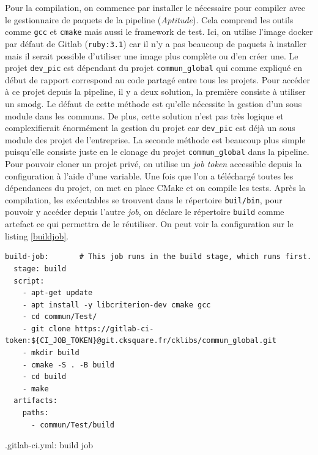 \documentclass[a4paper]{article}
\begin{document}
Pour la compilation, on commence par installer le nécessaire pour compiler avec
le gestionnaire de paquets de la pipeline (\textit{Aptitude}). Cela comprend les
outils comme \verb|gcc| et \verb|cmake| mais aussi le framework de test. Ici, on
utilise l'image docker par défaut de Gitlab (\verb|ruby:3.1|) car il n'y a pas
beaucoup de paquets à installer mais il serait possible d'utiliser une image
plus complète ou d'en créer une. Le projet \verb|dev_pic| est dépendant du
projet \verb|commun_global| qui comme expliqué en début de rapport correspond au
code partagé entre tous les projets. Pour accéder à ce projet depuis la
pipeline, il y a deux solution, la première consiste à utiliser un \gls{smodg}.
Le défaut de cette méthode est qu'elle nécessite la gestion d'un sous module
dans les communs. De plus, cette solution n'est pas très logique et
complexifierait énormément la gestion du projet car \verb|dev_pic| est déjà un
sous module des projet de l'entreprise. La seconde méthode est beaucoup plus
simple puisqu'elle consiste juste en le clonage du projet \verb|commun_global|
dans la pipeline. Pour pouvoir cloner un projet privé, on utilise un \textit{job
token} accessible depuis la configuration à l'aide d'une variable. Une fois que
l'on a téléchargé toutes les dépendances du projet, on met en place CMake et on
compile les tests. Après la compilation, les exécutables se trouvent dans le
répertoire \verb|buil/bin|, pour pouvoir y accéder depuis l'autre \textit{job},
on déclare le répertoire \verb|build| comme artefact ce qui permettra de le
réutiliser. On peut voir la configuration sur le listing \ref{buildjob}.

\begin{listing}[ht!]
\begin{verbatim}
build-job:       # This job runs in the build stage, which runs first.
  stage: build
  script:
    - apt-get update
    - apt install -y libcriterion-dev cmake gcc
    - cd commun/Test/
    - git clone https://gitlab-ci-token:${CI_JOB_TOKEN}@git.cksquare.fr/cklibs/commun_global.git
    - mkdir build
    - cmake -S . -B build
    - cd build
    - make
  artifacts:
    paths:
      - commun/Test/build
\end{verbatim}
\caption{.gitlab-ci.yml: build job}
\label{buildjob}
\end{listing}
\end{document}
